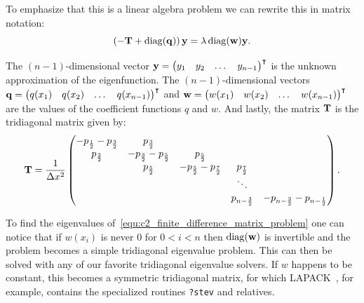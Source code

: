 To emphasize that this is a linear algebra problem we can rewrite this in matrix notation:
\begin{equation}\label{equ:c2_finite_difference_matrix_problem}
    \left(-\vb{T} + \operatorname{diag}(\vb{q})\right)\vb{y} = \lambda \operatorname{diag}(\vb{w}) \vb{y}\text{.}
\end{equation}

The $(n-1)$-dimensional vector $\vb{y} = {\begin{pmatrix}y_1 & y_2 & \dots & y_{n-1}\end{pmatrix}}^\intercal$ is the unknown approximation of the eigenfunction. The $(n-1)$-dimensional vectors $\vb{q} = {\begin{pmatrix}q(x_1) & q(x_2) & \dots & q(x_{n-1})\end{pmatrix}}^\intercal$  and $\vb{w} = {\begin{pmatrix}w(x_1) & w(x_2) & \dots & w(x_{n-1})\end{pmatrix}}^\intercal$ are the values of the coefficient functions $q$ and $w$. And lastly, the matrix $\vb{T}$ is the tridiagonal matrix given by:
$$
    \vb{T} = \frac{1}{\Delta x^2}\begin{pmatrix}
        -p_{\frac{1}{2}} -p_{\frac{3}{2}} & p_{\frac{3}{2}}                   &                                   &                     &                                            \\
        p_{\frac{3}{2}}                   & -p_{\frac{3}{2}} -p_{\frac{5}{2}} & p_{\frac{5}{2}}                   &                     &                                            \\
                                          & p_{\frac{5}{2}}                   & -p_{\frac{5}{2}} -p_{\frac{7}{2}} & p_{\frac{7}{2}}     &                                            \\
                                          &                                   &                                   & \ddots              &                                            \\
                                          &                                   &                                   & p_{n - \frac{3}{2}} & -p_{n - \frac{3}{2}} - p_{n - \frac{1}{2}} \\
    \end{pmatrix}{}\text{.}
$$

To find the eigenvalues of~\eqref{equ:c2_finite_difference_matrix_problem} one can notice that if $w(x_i)$ is never $0$ for $0 < i < n$ then $\operatorname{diag}(\vb{w})$ is invertible and the problem becomes a simple tridiagonal eigenvalue problem. This can then be solved with any of our favorite tridiagonal eigenvalue solvers. If $w$ happens to be constant, this becomes a symmetric tridiagonal matrix, for which LAPACK~\cite{lapack}, for example, contains the specialized routines \texttt{?stev} and relatives.

